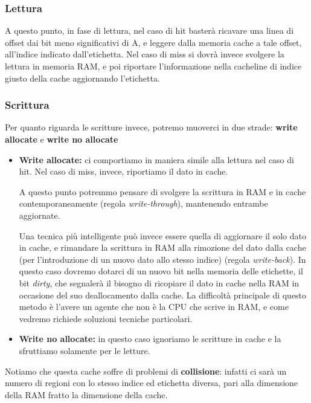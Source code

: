 \documentclass[a4paper,11pt]{article}
\begin{document}
\subsubsection{Lettura}
A questo punto, in fase di lettura, nel caso di hit basterà ricavare una linea di offset dai bit meno significativi di A, e leggere dalla memoria cache a tale offset, all'indice indicato dall'etichetta.
Nel caso di miss si dovrà invece svolgere la lettura in memoria RAM, e poi riportare l'informazione nella cacheline di indice giusto della cache aggiornando l'etichetta.

\subsubsection{Scrittura}
Per quanto riguarda le scritture invece, potremo muoverci in due strade: \textbf{write allocate} e \textbf{write no allocate}

\begin{itemize}
	\item \textbf{Write allocate:}
ci comportiamo in maniera simile alla lettura nel caso di hit.
Nel caso di miss, invece, riportiamo il dato in cache.

A questo punto potremmo pensare di svolgere la scrittura in RAM e in cache contemporaneamente (regola \textit{write-through}), mantenendo entrambe aggiornate.

Una tecnica più intelligente può invece essere quella di aggiornare il solo dato in cache, e rimandare la scrittura in RAM alla rimozione del dato dalla cache (per l'introduzione di un nuovo dato allo stesso indice) (regola \textit{write-back}).
In questo caso dovremo dotarci di un nuovo bit nella memoria delle etichette, il bit \textit{dirty}, che segnalerà il bisogno di ricopiare il dato in cache nella RAM in occasione del suo deallocamento dalla cache.
La difficoltà principale di questo metodo è l'avere un agente che non è la CPU che scrive in RAM, e come vedremo richiede soluzioni tecniche particolari.

\item \textbf{Write no allocate:}
in questo caso ignoriamo le scritture in cache e la sfruttiamo solamente per le letture.

\end{itemize}

\par\smallskip

Notiamo che questa cache soffre di problemi di \textbf{collisione}: infatti ci sarà un numero di regioni con lo stesso indice ed etichetta diversa, pari alla dimensione della RAM fratto la dimensione della cache.
\end{document}
